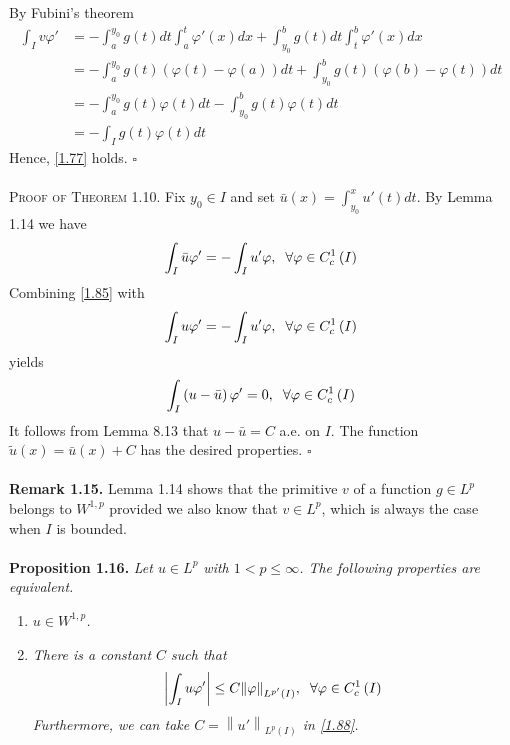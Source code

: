 \documentclass[a4paper,oneside]{book}
\numberwithin{equation}{chapter}
\begin{document}
By Fubini's theorem
\begin{align}
\int_I {v\varphi '}  &=  - \int_a^{{y_0}} {g\left( t \right)dt\int_a^t {\varphi '\left( x \right)dx} }  + \int_{{y_0}}^b {g\left( t \right)dt\int_t^b {\varphi '\left( x \right)dx} } \\
 &=  - \int_a^{{y_0}} {g\left( t \right)\left( {\varphi \left( t \right) - \varphi \left( a \right)} \right)dt}  + \int_{{y_0}}^b {g\left( t \right)\left( {\varphi \left( b \right) - \varphi \left( t \right)} \right)dt} \\
 &=  - \int_a^{{y_0}} {g\left( t \right)\varphi \left( t \right)dt}  - \int_{{y_0}}^b {g\left( t \right)\varphi \left( t \right)dt} \\
 &=  - \int_I {g\left( t \right)\varphi \left( t \right)dt} 
\end{align}
Hence, \eqref{1.77} holds. \hfill $\square$\\
\\
\textsc{Proof of Theorem 1.10.} Fix $y_0\in I$ and set $\bar u\left( x \right) = \int_{{y_0}}^x {u'\left( t \right)dt} $. By Lemma 1.14 we have
\begin{align}
\label{1.85}
\int_I {\bar u\varphi '}  =  - \int_I {u'\varphi } ,\hspace{0.2cm}\forall \varphi  \in C_c^1\left( I \right)
\end{align}
Combining \eqref{1.85} with 
\begin{align}
\int_I {u\varphi '}  =  - \int_I {u'\varphi } ,\hspace{0.2cm}\forall \varphi  \in C_c^1\left( I \right)
\end{align}
yields
\begin{align}
\int_I {\left( {u - \bar u} \right)\varphi '}  = 0,\hspace{0.2cm}\forall \varphi  \in C_c^1\left( I \right)
\end{align}
It follows from Lemma 8.13 that $u-\bar{u}=C$ a.e. on $I$. The function $\tilde u\left( x \right) = \bar u\left( x \right) + C$ has the desired properties. \hfill $\square$\\
\\
\textbf{Remark 1.15.} Lemma 1.14 shows that the primitive $v$ of a function $g\in L^p$ belongs to $W^{1,p}$ provided we also know that $v\in L^p$, which is always the case when $I$ is bounded.\\
\\
\textbf{Proposition 1.16.} \textit{Let $u\in L^p$ with $1<p\le \infty$. The following properties are equivalent.}
\begin{enumerate}
\item \textit{$u \in W^{1,p}$.}
\item \textit{There is a constant $C$ such that}
\begin{align}
\label{1.88}
\left| {\int_I {u\varphi '} } \right| \le C{\left\| \varphi  \right\|_{{L^{p'}}\left( I \right)}},\hspace{0.2cm}\forall \varphi  \in C_c^1\left( I \right)
\end{align}
\textit{Furthermore, we can take $C = {\left\| {u'} \right\|_{{L^p}\left( I \right)}}$ in \eqref{1.88}.}
\end{enumerate}
\end{document}
